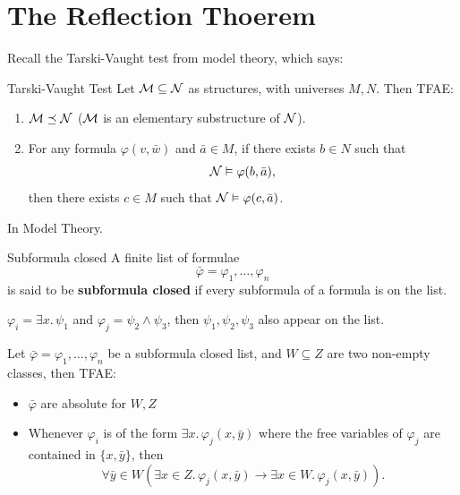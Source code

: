 \documentclass{article}
\begin{document}
\section{The Reflection Thoerem}
Recall the Tarski-Vaught test from model theory, which says:
\begin{fancythm*}{Tarski-Vaught Test}
    Let $\mathcal{M} \subseteq \mathcal{N}$ as structures, with universes $M,N$. Then TFAE: \begin{enumerate}
        \item[(i)] $\mathcal{M} \preceq \mathcal{N}$ ($\mathcal{M}$ is an elementary substructure of $\mathcal{N}$).
        \item[(ii)] For any formula $\varphi(v, \bar{w})$ and $\bar{a} \in M$, if there exists $b \in N$ such that \[ \mathcal{N} \vDash \varphi(b, \bar{a}),\] then there exists $c \in M$ such that $\mathcal{N} \vDash \varphi(c, \bar{a})$.
    \end{enumerate}
\end{fancythm*}
\proof In Model Theory. \endproof
\begin{fancydefine}{Subformula closed}
    A finite list of formulae \[ \bar{\varphi} = \varphi_{1}, \dots, \varphi_{n}\] is said to be \textbf{subformula closed} if every subformula of a formula is on the list.
\end{fancydefine}
\begin{ex*}
    $\varphi_{i} = \exists x.\, \psi_{1}$ and $\varphi_{j} = \psi_{2} \wedge \psi_{3}$, then $\psi_{1},\psi_{2},\psi_{3}$ also appear on the list.
\end{ex*}
\begin{fancylem}{}
    Let $\bar{\varphi} = \varphi_{1}, \dots, \varphi_{n}$ be a subformula closed list, and $W \subseteq Z$ are two non-empty classes, then TFAE: \begin{itemize}
        \item[(i)] $\bar{\varphi}$ are absolute for $W, Z$
        \item[(ii)] Whenever $\varphi_{i}$ is of the form $\exists x.\, \varphi_{j}(x,\bar{y})$ where the free variables of $\varphi_{j}$ are contained in $\{x, \bar{y}\}$, then \[\forall \bar{y} \in W \left( \exists x \in Z. \, \varphi_{j}(x, \bar{y}) \rightarrow \exists x \in W. \, \varphi_{j}(x,\bar{y}) \right).\]
    \end{itemize}
\end{fancylem}
\proof \hspace{0.1cm}
\end{document}

